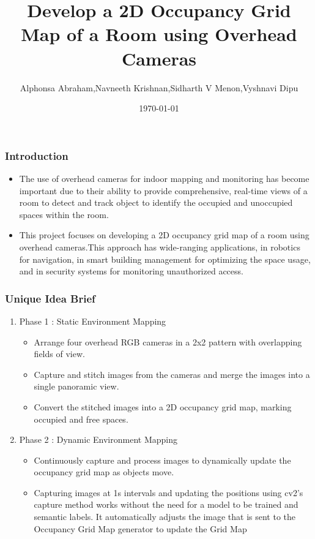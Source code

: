 \documentclass{beamer}
\title{Develop a 2D Occupancy Grid Map of a Room using Overhead Cameras}
\author{Alphonsa Abraham,Navneeth Krishnan,Sidharth V Menon,Vyshnavi Dipu}
\institute{Saintgits Group of Institutions}
\date{\today}
\begin{document}
\begin{frame}
  \titlepage
\end{frame}

\begin{frame}
  \frametitle{Introduction} 
  \begin{itemize}
    \item The use of overhead cameras for indoor mapping and monitoring has become important due to their ability to provide comprehensive, real-time views of a room to detect and track object to identify the occupied and unoccupied spaces within the room.
    \item This project focuses on developing a 2D occupancy grid map of a room using overhead cameras.This approach has wide-ranging applications, in robotics for navigation, in smart building management for optimizing the space usage, and in security systems for monitoring unauthorized access.
  \end{itemize}
\end{frame}

\begin{frame}
  \frametitle{Unique Idea Brief}
   \begin{enumerate}
   \item Phase 1 : Static Environment Mapping
   \begin{itemize}
    \item Arrange four overhead RGB cameras in a 2x2 pattern with overlapping fields of view.
    \item Capture and stitch images from the cameras and merge the images into  a single  panoramic view.
    \item Convert the stitched images into a 2D occupancy grid map, marking occupied and free spaces.
    \end{itemize}
    \item Phase 2 : Dynamic Environment Mapping
    \begin{itemize}
    \item Continuously capture and process images to dynamically update the occupancy grid map as objects move.
    \item Capturing images at 1s intervals and updating the positions using cv2's capture method works without the need for a model to be trained and semantic labels. It automatically adjusts the image that is sent to the Occupancy Grid Map generator to update the Grid Map
     \end{itemize}
    \end{enumerate}
\end{frame}
\end{document}
